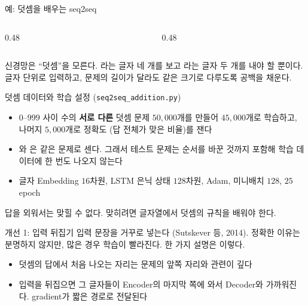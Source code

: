 \documentclass[aspectratio=169,11pt]{beamer}
\begin{document}
\begin{frame}{예: 덧셈을 배우는 seq2seq}
\begin{columns}[c,onlytextwidth]
\begin{column}{0.48\textwidth}
\end{column}
\begin{column}{0.48\textwidth}
\end{column}
\end{columns}
\vskip3mm
신경망은 ``덧셈''을 모른다. 라는 글자 네 개를 보고 라는 글자 두 개를 내야 할 뿐이다.
글자 단위로 입력하고, 문제의 길이가 달라도 같은 크기로 다루도록 공백을 채운다.
\end{frame}

\begin{frame}{덧셈 데이터와 학습 설정 (\texttt{seq2seq\_addition.py})}
\begin{itemize}
\item $0$--$999$ 사이 수의 \textbf{서로 다른} 덧셈 문제 $50{,}000$개를 만들어
$45{,}000$개로 학습하고, 나머지 $5{,}000$개로 정확도 (답 전체가 맞은 비율)를 잰다
\item {}와 은 같은 문제로 센다.
그래서 테스트 문제는 순서를 바꾼 것까지 포함해 학습 데이터에 한 번도 나오지 않는다
\item 글자 Embedding $16$차원, LSTM 은닉 상태 $128$차원, Adam, 미니배치 $128$, $25$ epoch
\end{itemize}
\vskip3mm
\begin{keybox}
답을 외워서는 맞힐 수 없다. 맞히려면 글자열에서 덧셈의 규칙을 배워야 한다.
\end{keybox}
\end{frame}

\begin{frame}{개선 1: 입력 뒤집기}
\vskip3mm
입력 문장을 거꾸로 넣는다 (Sutskever 등, 2014).
정확한 이유는 분명하지 않지만, 많은 경우 학습이 빨라진다. 한 가지 설명은 이렇다.
\begin{itemize}
\item 덧셈의 답에서 처음 나오는 자리는 문제의 앞쪽 자리와 관련이 깊다
\item 입력을 뒤집으면 그 글자들이 Encoder의 마지막 쪽에 와서 Decoder와 가까워진다.
gradient가 짧은 경로로 전달된다
\end{itemize}
\end{frame}
\end{document}
